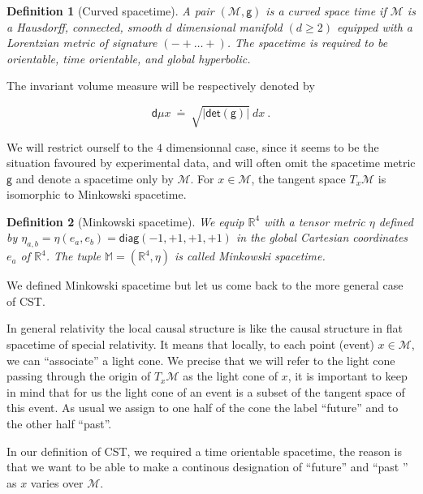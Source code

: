 \documentclass[11pt]{book}
\newcommand{\abs}[1]{\left|#1\right|}
\renewcommand{\det}{\mathsf{det}}
\newcommand{\Mcal}{\mathcal{M}}
\newcommand{\Mbb}{\mathbb{M}}
\newcommand{\Rbb}{\mathbb{R}}
\newcommand{\dsf}{\mathsf{d}}
\newcommand{\gsf}{\mathsf{g}}
\theoremstyle{break}
\newtheorem{definition}{Definition}
\begin{document}
\begin{definition}[Curved spacetime]
A pair $(\Mcal,\gsf)$ is a curved space time if $\Mcal$ is a Hausdorff, connected, smooth $d$ dimensional manifold $(d \geq 2)$ equipped with a Lorentzian metric of signature $( - + \dots +)$. The spacetime is required to be orientable, time orientable, and global hyperbolic. 
\end{definition}

The invariant volume measure will be respectively denoted by  

\begin{equation*} 
 \dsf\mu x \ \doteq \ \sqrt{\abs{\det(\gsf)}} \ dx \ .
\end{equation*}

We will restrict ourself to the $4$ dimensionnal case, since it seems to be the situation favoured by experimental data, and will often omit the spacetime metric $\gsf$ and denote a spacetime only by $\Mcal$. For $x\in\Mcal$, the tangent space $T_x\Mcal$ is isomorphic to Minkowski spacetime. \par

\begin{definition}[Minkowski spacetime]
We equip $\Rbb^4$ with a tensor metric $\eta$ defined by $\eta_{a,b} = \eta(e_a,e_b) = \mathsf{diag}(-1,+1,+1,+1)$ in the global Cartesian coordinates $e_a$ of $\Rbb^4$. The tuple $\Mbb = \left(\Rbb^4,\eta\right)$ is called Minkowski spacetime. 
\end{definition}

We defined Minkowski spacetime but let us come back to the more general case of CST. \par

In general relativity the local causal structure is like the causal structure in flat spacetime of special relativity. It means that locally, to each point (event) $x\in\Mcal$, we can ``associate'' a light cone. We precise that we will refer to the light cone passing through the origin of $T_x\Mcal$ as the light cone of $x$, it is important to keep in mind that for us the light cone of an event is a subset of the tangent space of this event.
As usual we assign to one half of the cone the label ``future'' and to the other half ``past''. \par

In our definition of CST, we required a time orientable spacetime, the reason is that we want to be able to make a continous designation of ``future'' and ``past '' as $x$ varies over $\Mcal$. \par
\end{document}
